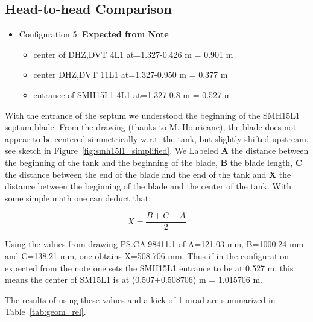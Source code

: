 \documentclass[11pt,letter,english]{article}
\begin{document}
\subsection*{Head-to-head Comparison}

\begin{itemize}

\item Configuration 5: {\bf Expected from Note}
  \begin{itemize}
  \item center of DHZ,DVT 4L1 at=1.327-0.426 m = 0.901 m 
  \item center DHZ,DVT 11L1 at=1.327-0.950 m = 0.377 m 
  \item entrance of SMH15L1 4L1 at=1.327-0.8 m = 0.527 m 
  \end{itemize}
\end{itemize}


With the entrance of the septum we understood the beginning of the SMH15L1
septum blade.  From the drawing (thanks to M. Houricane), the blade does not
appear to be centered simmetrically w.r.t. the tank, but slightly shifted
upstream, see sketch in Figure~\ref{fig:smh15l1_simplified}. We Labeled {\bf A}
the distance between the beginning of the tank and the beginning of the
blade, {\bf B} the blade length, {\bf C} the distance between the end of the
blade and the end of the tank and {\bf X} the distance between the beginning of
the blade and the center of the tank. With some simple math one can deduct that:

\begin{equation}
X = \frac{B+C-A}{2}
\end{equation}

Using the values from drawing PS.CA.98411.1 of A=121.03 mm, B=1000.24 mm and
C=138.21 mm, one obtains X=508.706 mm. Thus if in the configuration expected from
the note one sets the SMH15L1 entrance to be at 0.527 m, this means the center
of SM15L1 is at (0.507+0.508706) m = 1.015706 m.

The results of using these values and a kick of 1 mrad are summarized in Table~\ref{tab:geom_rel}.
\end{document}
